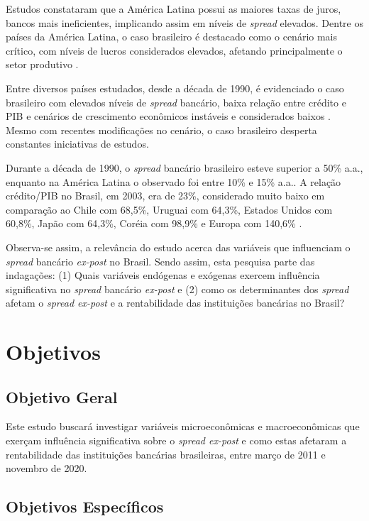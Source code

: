\documentclass[
  12pt,
  12pt,
  openright,
  oneside,
  a4paper,
  chapter=TITLE,
  section=TITLE,
  subsection=TITLE,
  subsubsection=TITLE,
  english,
  portugues,
  sumario=tradicional]{abntex2}
\begin{document}
Estudos constataram que a América Latina possui as maiores taxas de juros, bancos mais ineficientes, implicando assim em níveis de \emph{spread} elevados. Dentre os países da América Latina, o caso brasileiro é destacado como o cenário mais crítico, com níveis de lucros considerados elevados, afetando principalmente o setor produtivo \cite{dantas:2012}.

Entre diversos países estudados, desde a década de 1990, é evidenciado o caso brasileiro com elevados níveis de \emph{spread} bancário, baixa relação entre crédito e PIB e cenários de crescimento econômicos instáveis e considerados baixos \cite{levine:1997, matos:2003}. Mesmo com recentes modificações no cenário, o caso brasileiro desperta constantes iniciativas de estudos.

Durante a década de 1990, o \emph{spread} bancário brasileiro esteve superior a 50\% a.a., enquanto na América Latina o observado foi entre 10\% e 15\% a.a.. A relação crédito/PIB no Brasil, em 2003, era de 23\%, considerado muito baixo em comparação ao Chile com 68,5\%, Uruguai com 64,3\%, Estados Unidos com 60,8\%, Japão com 64,3\%, Coréia com 98,9\% e Europa com 140,6\% \cite{camargo:2009, singh:2005}.

Observa-se assim, a relevância do estudo acerca das variáveis que influenciam o \emph{spread} bancário \emph{ex-post} no Brasil. Sendo assim, esta pesquisa parte das indagações: (1) Quais variáveis endógenas e exógenas exercem influência significativa no \emph{spread} bancário \emph{ex-post} e (2) como os determinantes dos \emph{spread} afetam o \emph{spread ex-post} e a rentabilidade das instituições bancárias no Brasil?

\section{Objetivos}

\subsection{Objetivo Geral}

Este estudo buscará investigar variáveis microeconômicas e macroeconômicas que exerçam influência significativa sobre o \emph{spread ex-post} e como estas afetaram a rentabilidade das instituições bancárias brasileiras, entre março de 2011 e novembro de 2020.

\subsection{Objetivos Específicos}
\end{document}
